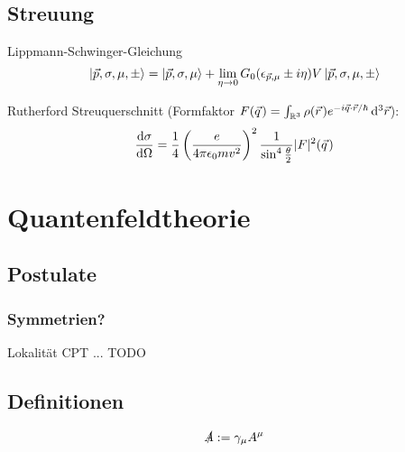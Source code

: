 \documentclass[11pt]{article}
\numberwithin{equation}{section}
\begin{document}
		\subsection{Streuung}
			\noindent
			Lippmann-Schwinger-Gleichung
			\begin{equation}
				\Ket{\vec{p},\sigma,\mu,\pm} = \Ket{\vec{p}, \sigma, \mu} + \lim_{\eta\rightarrow 0} G_0(\epsilon_{\vec{p},\mu}\pm i\eta) V \Ket{\vec{p},\sigma,\mu,\pm}
			\end{equation}

			Rutherford Streuquerschnitt (Formfaktor $F(\pvec{q}) = \int_{\mathbb{R}^3} \rho(\pvec{r}) e^{-i \vec{q}\cdot\vec{r}/\hbar}\, \diff^3 \vec{r} $):
			\begin{equation}
				\tder{\sigma}{\Omega} = \frac{1}{4} \Br{\frac{e}{4\pi\epsilon_0 m v^2}}^2
				\frac{1}{\sin^4\frac{\theta}{2}} \vbr{F}^2(\pvec{q})
			\end{equation}


	\newpage
	\section{Quantenfeldtheorie} %
		\subsection{Postulate}
			\subsubsection{Symmetrien?}
				Lokalität
				CPT
				...
				TODO
		\subsection{Definitionen}
			\begin{equation}
				\slashed{A} := \gamma_\mu A^\mu
			\end{equation}
\end{document}

